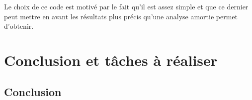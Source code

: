 \documentclass[12pt]{article}
\begin{document}
Le choix de ce code est motivé par le fait qu'il est assez simple et que
ce dernier peut mettre en avant les résultats plus précis qu'une analyse
amortie permet d'obtenir.

\begin{Shaded}
  \begin{Highlighting}[]
    \NormalTok{ =}
    \NormalTok{  | }
    \NormalTok{  | } 
    \NormalTok{  ;;}


    \NormalTok{  (}
    \NormalTok{  ;;}

    \NormalTok{    (}
    \NormalTok{      (}
    \NormalTok{      | [] {-}\textgreater{} (}
    \NormalTok{                | [] {-}\textgreater{} (}
    \NormalTok{              )}
    \NormalTok{    )}
    \NormalTok{  ;;}

    \NormalTok{ elems = [}\NormalTok{;}\NormalTok{;}\NormalTok{;}\NormalTok{;}\NormalTok{;}\NormalTok{;}\NormalTok{];;}
  \end{Highlighting}
\end{Shaded}

\hypertarget{conclusion-et-tuxe2ches-uxe0-ruxe9aliser}{%
  \section{Conclusion et tâches à
    réaliser}\label{conclusion-et-tuxe2ches-uxe0-ruxe9aliser}}

\hypertarget{conclusion}{%
  \subsection{Conclusion}\label{conclusion}}
\end{document}
